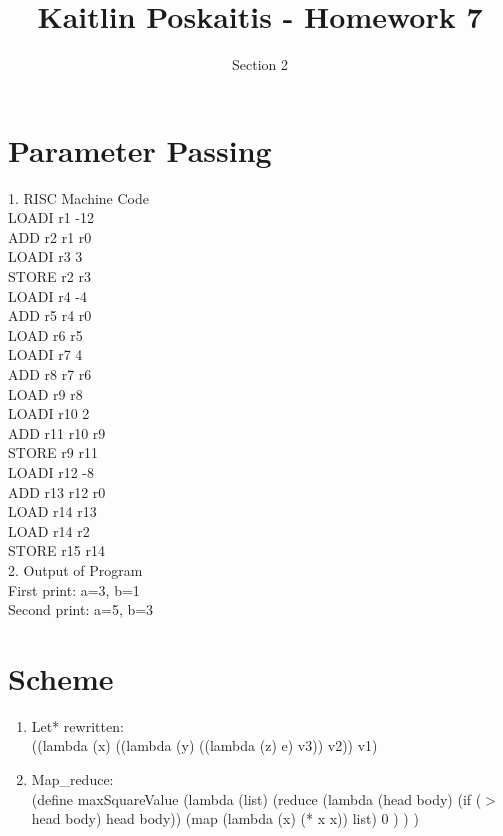 \documentclass[11pt]{article}
\title{\bf Kaitlin Poskaitis - Homework 7}
\author{Section 2}
\date{}
\begin{document}
\maketitle

\section{Parameter Passing}

1. RISC Machine Code\\
\indent LOADI r1 -12\\ %
\indent ADD r2 r1 r0\\ %
\indent LOADI r3 3\\ %
\indent STORE r2 r3\\ %
\indent LOADI r4 -4\\ %
\indent ADD r5 r4 r0\\ %
\indent LOAD r6 r5\\ %
\indent LOADI r7 4\\ %
\indent ADD r8 r7 r6\\ %
\indent LOAD r9 r8\\ %
\indent LOADI r10 2\\ %
\indent ADD r11 r10 r9\\ %
\indent STORE r9 r11\\ %
\indent LOADI r12 -8\\ %
\indent ADD r13 r12 r0\\ %
\indent LOAD r14 r13\\ %
\indent LOAD r14 r2\\ %
\indent STORE r15 r14\\ %

2. Output of Program \\
\indent First print: a=3, b=1\\
\indent Second print: a=5, b=3\\

\section{Scheme}

\begin{enumerate}
	\item Let* rewritten:\\
((lambda (x)
   ((lambda (y)
      ((lambda (z)
         e)
       v3))
    v2))
 v1)

\item Map\_reduce:\\
(define maxSquareValue
  (lambda (list)
    (reduce (lambda (head body)
      (if ($>$ head body) head body))
      (map (lambda (x) (* x x)) list)
      0
    )
  )
)

\end{enumerate}  
\end{document}
